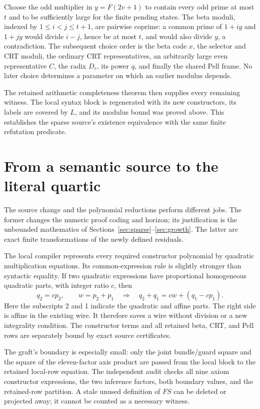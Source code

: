 \documentclass[11pt,letterpaper]{article}
\theoremstyle{remark}\newtheorem{remark}[theorem]{Remark}
\begin{document}
Choose the odd multiplier in $y=F(2v+1)$ to contain every odd prime at
most $t$ and to be sufficiently large for the finite pending states.
The beta moduli, indexed by $1\le i<j\le t+1$, are pairwise coprime:
a common prime of $1+iy$ and
$1+jy$ would divide $i-j$, hence be at most $t$, and would also divide
$y$, a contradiction. The subsequent choice order is the beta code
$x$, the selector and CRT moduli, the ordinary CRT representatives,
an arbitrarily large even representative $C$, the radix $D_r$, its
power $q$, and finally the shared Pell frame. No later choice determines
a parameter on which an earlier modulus depends.

The retained arithmetic completeness theorem then supplies every
remaining witness. The local syntax block is regenerated with its new
constructors, its labels are covered by $L$, and its modulus bound was
proved above. This establishes the sparse source's existence equivalence
with the same finite refutation predicate.

\section{From a semantic source to the literal quartic}
\label{sec:compilation}

The source change and the polynomial reductions perform different jobs.
The former changes the numeric proof coding and horizon; its justification
is the unbounded mathematics of Sections~\ref{sec:sparse}--\ref{sec:growth}.
The latter are exact finite transformations of the newly defined residuals.

The local compiler represents every required constructor polynomial by
quadratic multiplication equations. Its common-expression rule is slightly
stronger than syntactic equality. If two quadratic expressions have
proportional homogeneous quadratic parts, with integer ratio $c$, then
\[
 q_2=cp_2,\qquad w=p_2+p_1
 \quad\Longrightarrow\quad q_2+q_1=cw+(q_1-cp_1).
\]
Here the subscripts 2 and 1 indicate the quadratic and affine parts.
The right side is affine in the existing wire. It therefore saves a
wire without division or a new integrality condition. The constructor
terms and all retained beta, CRT, and Pell rows are separately bound
by exact source certificates.

The graft's boundary is especially small: only the joint bundle/guard
square and the square of the eleven-factor axis product are passed
from the local block to the retained local-row equation. The independent
audit checks all nine axiom constructor expressions, the two inference
factors, both boundary values, and the retained-row partition. A stale
unused definition of $FS$ can be deleted or projected away; it cannot
be counted as a necessary witness.
\end{document}
